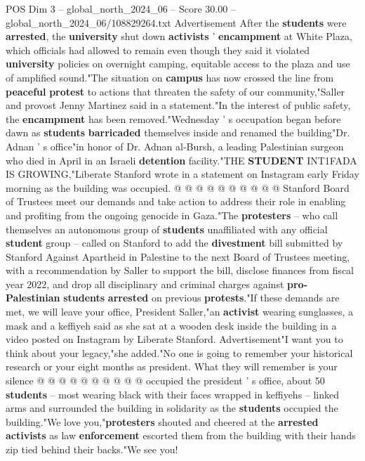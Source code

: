 \begin{textsample}{POS Dim 3 – global\_north\_2024\_06 – Score 30.00 – global\_north\_2024\_06/108829264.txt}
Advertisement After the \textbf{students} were \textbf{arrested}, the \textbf{university} shut down \textbf{activists} ' \textbf{encampment} at White Plaza, which officials had allowed to remain even though they said it violated \textbf{university} policies on overnight camping, equitable access to the plaza and use of amplified sound."The situation on \textbf{campus} has now crossed the line from \textbf{peaceful} \textbf{protest} to actions that threaten the safety of our community,"Saller and provost Jenny Martinez said in a statement."In the interest of public safety, the \textbf{encampment} has been removed."Wednesday ' s occupation began before dawn as \textbf{students} \textbf{barricaded} themselves inside and renamed the building"Dr.
Adnan ' s office"in honor of Dr.
Adnan al-Bursh, a leading Palestinian surgeon who died in April in an Israeli \textbf{detention} facility."THE \textbf{STUDENT} INT1FADA IS GROWING,"Liberate Stanford wrote in a statement on Instagram early Friday morning as the building was occupied. @ @ @ @ @ @ @ @ @ @ Stanford Board of Trustees meet our demands and take action to address their role in enabling and profiting from the ongoing genocide in Gaza."The \textbf{protesters} -- who call themselves an autonomous group of \textbf{students} unaffiliated with any official \textbf{student} group -- called on Stanford to add the \textbf{divestment} bill submitted by Stanford Against Apartheid in Palestine to the next Board of Trustees meeting, with a recommendation by Saller to support the bill, disclose finances from fiscal year 2022, and drop all disciplinary and criminal charges against \textbf{pro-Palestinian} \textbf{students} \textbf{arrested} on previous \textbf{protests}."If these demands are met, we will leave your office, President Saller,"an \textbf{activist} wearing sunglasses, a mask and a keffiyeh said as she sat at a wooden desk inside the building in a video posted on Instagram by Liberate Stanford.
Advertisement"I want you to think about your legacy,"she added."No one is going to remember your historical research or your eight months as president.
What they will remember is your silence @ @ @ @ @ @ @ @ @ @ occupied the president ' s office, about 50 \textbf{students} -- most wearing black with their faces wrapped in keffiyehs -- linked arms and surrounded the building in solidarity as the \textbf{students} occupied the building."We love you,"\textbf{protesters} shouted and cheered at the \textbf{arrested} \textbf{activists} as law \textbf{enforcement} escorted them from the building with their hands zip tied behind their backs."We see you!

\end{textsample}
